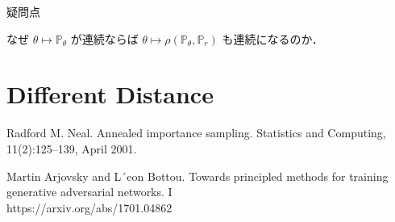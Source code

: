 \documentclass[uplatex, dvipdfmx]{jsarticle}
\theoremstyle{definition}
\begin{document}
\begin{itembox}[l]{疑問点}
\begin{enumerate}
            なぜ $\theta \longmapsto \mathbb{P}_{\theta}$ が連続ならば $\theta \longmapsto \rho (\mathbb{P}_{\theta}, \mathbb{P}_{r})$ も連続になるのか．

        \end{enumerate}
        
    \end{itembox}

    \section{Different Distance}

    \newpage
    \begin{thebibliography}{10}
        Radford M. Neal. Annealed importance sampling. 
        Statistics and Computing, 11(2):125–139, April 2001.

        Martin Arjovsky and L´eon Bottou.
        Towards principled methods for training generative adversarial networks. I \\
        https://arxiv.org/abs/1701.04862
    \end{thebibliography}
    
    
\end{document}
